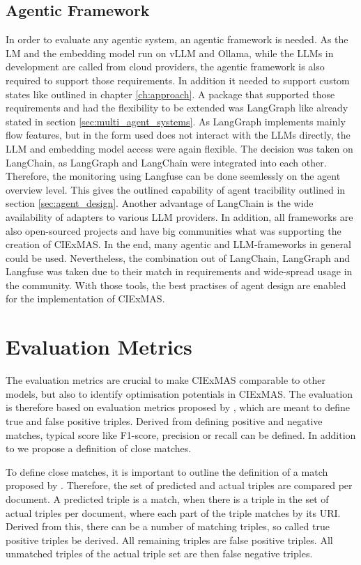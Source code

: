 \documentclass[a4paper,oneside,bibliography=totoc]{scrbook}
\begin{document}
\subsection{Agentic Framework}
\label{subsec:agentic_framework}
In order to evaluate any agentic system, an agentic framework is needed. As the \ac{LM} and the embedding model run on vLLM and Ollama, while the \acp{LLM} in development are called from cloud providers, the agentic framework is also required to support those requirements. In addition it needed to support custom states like outlined in chapter \ref{ch:approach}.
A package that supported those requirements and had the flexibility to be extended was LangGraph like already stated in section \ref{sec:multi_agent_systems}. As LangGraph implements mainly flow features, but in the form used does not interact with the \acp{LLM} directly, the \ac{LLM} and embedding model access were again flexible. The decision was taken on LangChain, as LangGraph and LangChain were integrated into each other. Therefore, the monitoring using Langfuse can be done seemlessly on the agent overview level. This gives the outlined capability of agent tracibility outlined in section \ref{sec:agent_design}. Another advantage of LangChain is the wide availability of adapters to various LLM providers. In addition, all frameworks are also open-sourced projects and have big communities what was supporting the creation of CIExMAS.
In the end, many agentic and \ac{LLM}-frameworks in general could be used. Nevertheless, the combination out of LangChain, LangGraph and Langfuse was taken due to their match in requirements and wide-spread usage in the community. With those tools, the best practises of agent design are enabled for the implementation of CIExMAS.

\section{Evaluation Metrics}
\label{sec:evaluation_metrics}
The evaluation metrics are crucial to make CIExMAS comparable to other models, but also to identify optimisation potentials in CIExMAS. The evaluation is therefore based on evaluation metrics proposed by \citet{Josifoski2021}, which are meant to define true and false positive triples. Derived from defining positive and negative matches, typical score like F1-score, precision or recall can be defined. In addition to \citet{Josifoski2021} we propose a definition of close matches.

To define close matches, it is important to outline the definition of a match proposed by \citet{Josifoski2021}. Therefore, the set of predicted and actual triples are compared per document. A predicted triple is a match, when there is a triple in the set of actual triples per document, where each part of the triple matches by its \ac{URI}. Derived from this, there can be a number of matching triples, so called true positive triples be derived. All remaining triples are false positive triples. All unmatched triples of the actual triple set are then false negative triples.
\end{document}
